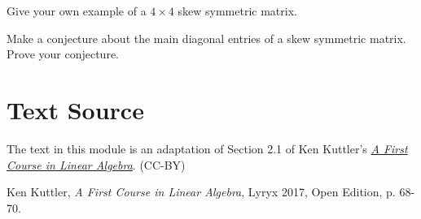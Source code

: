 \documentclass{ximera}
\begin{document}
\begin{problem}\label{prob:4by4symmetricex}
Give your own example of a $4\times 4$ skew symmetric matrix.
\end{problem}

\begin{problem} \label{prob:maindiagskewsymm}
Make a conjecture about the main diagonal entries of a skew symmetric matrix.  Prove your conjecture.
\end{problem}

\section*{Text Source}
The text in this module is an adaptation of Section 2.1 of Ken Kuttler's \href{https://open.umn.edu/opentextbooks/textbooks/a-first-course-in-linear-algebra-2017}{\it A First Course in Linear Algebra}. (CC-BY)

Ken Kuttler, {\it  A First Course in Linear Algebra}, Lyryx 2017, Open Edition, p. 68-70.
\end{document}
